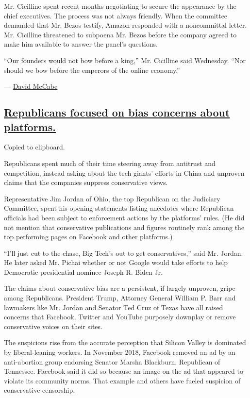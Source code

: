 Mr. Cicilline spent recent months negotiating to secure the appearance
by the chief executives. The process was not always friendly. When the
committee demanded that Mr. Bezos testify, Amazon responded with a
noncommittal letter. Mr. Cicilline threatened to subpoena Mr. Bezos
before the company agreed to make him available to answer the panel's
questions.

``Our founders would not bow before a king,'' Mr. Cicilline said
Wednesday. ``Nor should we bow before the emperors of the online
economy.''

--- \href{https://www.nytimes3xbfgragh.onion/by/david-mccabe}{David
McCabe}

\hypertarget{republicans-focused-on-bias-concerns-about-platforms}{%
\subsection{\texorpdfstring{\protect\hyperlink{republicans-focused-on-bias-concerns-about-platforms}{Republicans
focused on bias concerns about
platforms.}}{Republicans focused on bias concerns about platforms.}}\label{republicans-focused-on-bias-concerns-about-platforms}}

Copied to clipboard.

Republicans spent much of their time steering away from antitrust and
competition, instead asking about the tech giants' efforts in China and
unproven claims that the companies suppress conservative views.

Representative Jim Jordan of Ohio, the top Republican on the Judiciary
Committee, spent his opening statements listing anecdotes where
Republican officials had been subject to enforcement actions by the
platforms' rules. (He did not mention that conservative publications and
figures routinely rank among the top performing pages on Facebook and
other platforms.)

``I'll just cut to the chase, Big Tech's out to get conservatives,''
said Mr. Jordan. He later asked Mr. Pichai whether or not Google would
take efforts to help Democratic presidential nominee Joseph R. Biden Jr.

The claims about conservative bias are a persistent, if largely
unproven, gripe among Republicans. President Trump, Attorney General
William P. Barr and lawmakers like Mr. Jordan and Senator Ted Cruz of
Texas have all raised concerns that Facebook, Twitter and YouTube
purposely downplay or remove conservative voices on their sites.

The suspicions rise from the accurate perception that Silicon Valley is
dominated by liberal-leaning workers. In November 2018, Facebook removed
an ad by an anti-abortion group endorsing Senator Marsha Blackburn,
Republican of Tennessee. Facebook said it did so because an image on the
ad that appeared to violate its community norms. That example and others
have fueled suspicion of conservative censorship.

